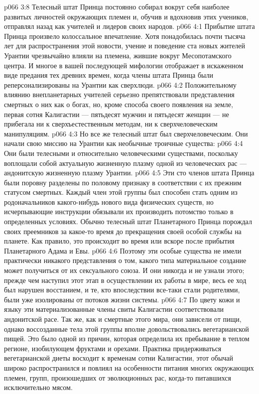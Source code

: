 \vs p066 3:8 Телесный штат Принца постоянно собирал вокруг себя наиболее развитых личностей окружающих племен и, обучив и вдохновив этих учеников, отправлял назад как учителей и лидеров своих народов.
\vs p066 4:1 Прибытие штата Принца произвело колоссальное впечатление. Хотя понадобилась почти тысяча лет для распространения этой новости, учение и поведение ста новых жителей Урантии чрезвычайно влияли на племена, жившие вокруг Месопотамского центра. И многое в вашей последующей мифологии отображает в искаженном виде предания тех древних времен, когда члены штата Принца были реперсонализированы на Урантии как сверхлюди.
\vs p066 4:2 Положительному влиянию внепланетарных учителей серьезно препятствовали представления смертных о них как о богах, но, кроме способа своего появления на земле, первая сотня Калигастии --- пятьдесят мужчин и пятьдесят женщин --- не прибегала ни к сверхъестественным методам, ни к сверхчеловеческим манипуляциям.
\vs p066 4:3 Но все же телесный штат был сверхчеловеческим. Они начали свою миссию на Урантии как необычные троичные существа:
\vs p066 4:4 \bibnobreakspace Они были телесными и относительно человеческими существами, поскольку воплощали собой актуальную жизненную плазму одной из человеческих рас --- андонитскую жизненную плазму Урантии.
\vs p066 4:5 Эти сто членов штата Принца были поровну разделены по половому признаку в соответствии с их прежним статусом смертных. Каждый член этой группы был способен стать одним из родоначальников какого\hyp{}нибудь нового вида физических существ, но исчерпывающие инструкции обязывали их производить потомство только в определенных условиях. Обычно телесный штат Планетарного Принца порождал своих преемников за какое\hyp{}то время до прекращения своей особой службы на планете. Как правило, это происходит во время или вскоре после прибытия Планетарного Адама и Евы.
\vs p066 4:6 Поэтому эти особые существа не имели практически никакого представления о том, какого типа материальное создание может получиться от их сексуального союза. И они никогда и не узнали этого; прежде чем наступил этот этап в осуществлении их работы в мире, весь ее ход был нарушен восстанием, и те, кто впоследствии все\hyp{}таки стали родителями, были уже изолированы от потоков жизни системы.
\vs p066 4:7 По цвету кожи и языку эти материализованные члены свиты Калигастии соответствовали андонитской расе. Так же, как и смертные этого мира, они зависели от пищи, однако воссозданные тела этой группы вполне довольствовались вегетарианской пищей. Это было одной из причин, которая определила их пребывание в теплом регионе, изобилующем фруктами и орехами. Практика придерживаться вегетарианской диеты восходит к временам сотни Калигастии, этот обычай широко распространился и повлиял на особенности питания многих окружающих племен, групп, произошедших от эволюционных рас, когда\hyp{}то питавшихся исключительно мясом.
